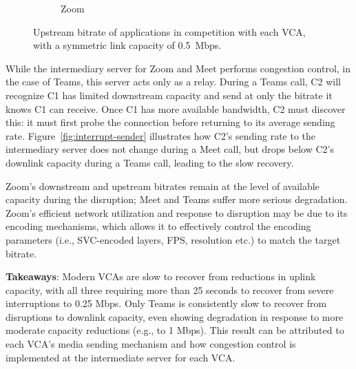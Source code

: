 \begin{figure}[t!]
\begin{subfigure}[t]{.33\textwidth}
        \caption{Zoom}
        \label{fig:zoom_ul_box}
    \end{subfigure}
    \caption{Upstream bitrate of applications in competition with each VCA, with a symmetric link capacity of 0.5~Mbps.}
    \label{fig:boxplot-upld}
\end{figure}

While the intermediary server for Zoom and Meet performs congestion control,
in the case of Teams, this server acts only as a relay. During a
Teams call, C2 will recognize C1 has limited downstream capacity and 
send at only the bitrate it knows C1 can receive.
Once C1 has more available bandwidth, C2 must discover this: it must first
probe the connection before returning to its average sending rate.
Figure~\ref{fig:interrupt-sender} illustrates how C2's sending rate to the intermediary server does not
change during a Meet call, but drops below C2's downlink capacity during a
Teams call, leading to the slow recovery.

Zoom's downstream and upstream bitrates remain at the level of available
capacity during the disruption; Meet and Teams suffer more
serious degradation. Zoom's efficient network utilization and response to
disruption may be due to its encoding mechanisms, which allows it to  
effectively control the encoding parameters (i.e., SVC-encoded layers, FPS,
resolution etc.) to match the target bitrate.  
\vspace{5pt}
\begin{mdframed}[roundcorner=5pt, backgroundcolor=black!10] \noindent
    \textbf{Takeaways}: Modern VCAs are slow to recover from reductions in uplink 
    capacity, with all three requiring more than 25 seconds to recover from severe
    interruptions to 0.25 Mbps. Only Teams is consistently slow to recover
    from disruptions to downlink capacity, even showing degradation in
    response to more moderate capacity reductions (e.g., to 1 Mbps).
    This result can be attributed to each VCA's media sending mechanism and how
    congestion control is implemented at the intermediate server for each VCA. 
\end{mdframed}



